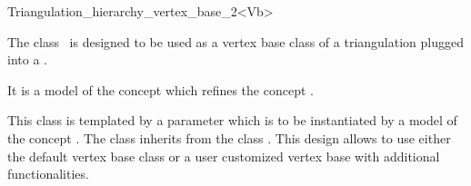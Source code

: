 

\begin{ccRefClass}{Triangulation_hierarchy_vertex_base_2<Vb>}


\ccDefinition
  
The class \ccRefName\ is designed to be used as a vertex base class
of a triangulation plugged into a
.

It is 
a model of the concept
 which refines
the concept
.

This class is templated by a parameter 
which is to be instantiated by a model of  the concept
.
The class  inherits
from the class .
This design allows to use either the default
vertex base class or a user customized
vertex base with additional functionalities.


\ccIsModel
{}

\ccInheritsFrom
{}


\ccSeeAlso
{} \\
 \\




\end{ccRefClass}


